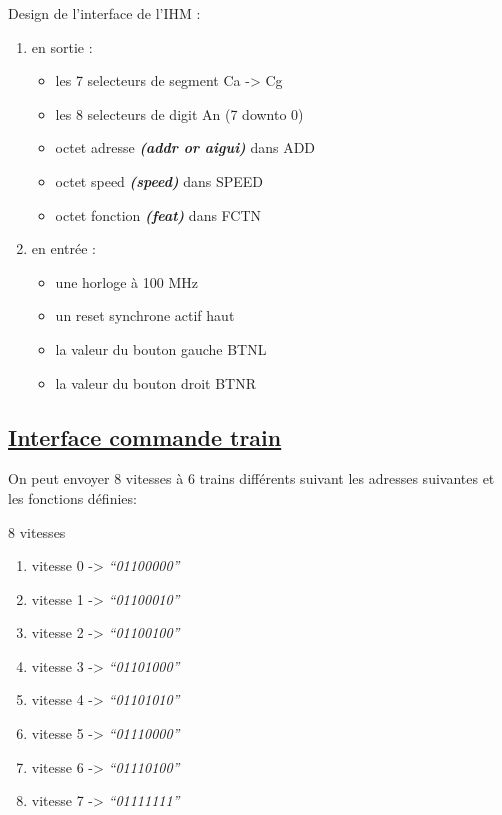 \hrulefill

Design de l'interface de l'IHM :
\begin{enumerate}
\item en sortie :
  \begin{itemize}  
  \item les 7 selecteurs de segment Ca -> Cg
  \item les 8 selecteurs de digit   An (7 downto 0)
  \item octet adresse \textbf{\emph{(addr or aigui)}}  dans ADD
  \item octet speed \textbf{\emph{(speed)}}  dans SPEED
  \item octet fonction \textbf{\emph{(feat)}}  dans FCTN    
  \end{itemize}  
\item en entrée :
  \begin{itemize}  
  \item une horloge à 100 MHz
  \item un reset synchrone actif haut 
  \item la valeur du bouton gauche BTNL
  \item la valeur du bouton droit BTNR    
  \end{itemize}  
\end{enumerate}

\subsection{\underline{Interface commande train}}
\label{sec:ihm-train}
On peut envoyer 8 vitesses à 6 trains différents suivant les adresses suivantes et les fonctions définies:
\bigskip

8 vitesses
\begin {enumerate}
\item vitesse 0 -> \emph{``01100000''}
\item vitesse 1 -> \emph{``01100010''}
\item vitesse 2 -> \emph{``01100100''}
\item vitesse 3 -> \emph{``01101000''}
\item vitesse 4 -> \emph{``01101010''}
\item vitesse 5 -> \emph{``01110000''}
\item vitesse 6 -> \emph{``01110100''}
\item vitesse 7 -> \emph{``01111111''}
\end {enumerate}  

\bigskip

